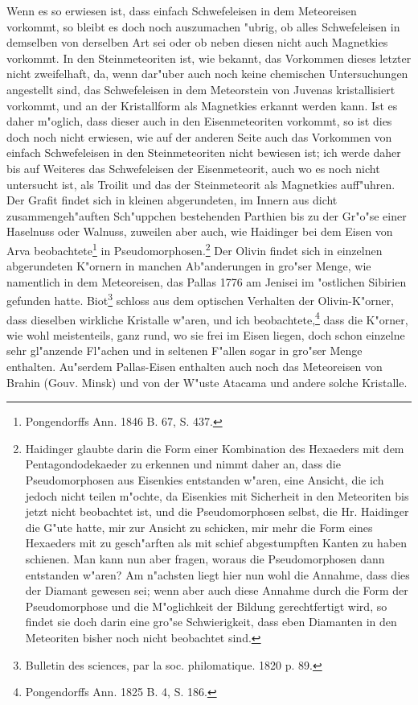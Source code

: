 \documentclass[a4paper, 11pt, oneside]{article}
\begin{document}
Wenn es so erwiesen ist, dass einfach Schwefeleisen in dem Meteoreisen vorkommt, so bleibt es doch noch auszumachen "ubrig, ob alles Schwefeleisen in demselben von derselben Art sei oder ob neben diesen nicht auch Magnetkies vorkommt. In den Steinmeteoriten ist, wie bekannt, das Vorkommen dieses letzter nicht zweifelhaft, da, wenn dar"uber auch noch keine chemischen Untersuchungen angestellt sind, das Schwefeleisen in dem Meteorstein von Juvenas kristallisiert vorkommt, und an der Kristallform als Magnetkies erkannt werden kann. Ist es daher m"oglich, dass dieser auch in den Eisenmeteoriten vorkommt, so ist dies doch noch nicht erwiesen, wie auf der anderen Seite auch das Vorkommen von einfach Schwefeleisen in den Steinmeteoriten nicht bewiesen ist; ich werde daher bis auf Weiteres das Schwefeleisen der Eisenmeteorit, auch wo es noch nicht untersucht ist, als Troilit und das der Steinmeteorit als Magnetkies auff"uhren. Der Grafit findet sich in kleinen abgerundeten, im Innern aus dicht zusammengeh"auften Sch"uppchen bestehenden Parthien bis zu der Gr"o"se einer Haselnuss oder Walnuss, zuweilen aber auch, wie Haidinger bei dem Eisen von Arva beobachtete\footnote{Pongendorffs Ann. 1846 B. 67, S. 437.} in Pseudomorphosen.\footnote{Haidinger glaubte darin die Form einer Kombination des Hexaeders mit dem Pentagondodekaeder zu erkennen und nimmt daher an, dass die Pseudomorphosen aus Eisenkies entstanden w"aren, eine Ansicht, die ich jedoch nicht teilen m"ochte, da Eisenkies mit Sicherheit in den Meteoriten bis jetzt nicht beobachtet ist, und die Pseudomorphosen selbst, die Hr. Haidinger die G"ute hatte, mir zur Ansicht zu schicken, mir mehr die Form eines Hexaeders mit zu gesch"arften als mit schief abgestumpften Kanten zu haben schienen. Man kann nun aber fragen, woraus die Pseudomorphosen dann entstanden w"aren? Am n"achsten liegt hier nun wohl die Annahme, dass dies der Diamant gewesen sei; wenn aber auch diese Annahme durch die Form der Pseudomorphose und die M"oglichkeit der Bildung gerechtfertigt wird, so findet sie doch darin eine gro"se Schwierigkeit, dass eben Diamanten in den Meteoriten bisher noch nicht beobachtet sind.} Der Olivin findet sich in einzelnen abgerundeten K"ornern in manchen Ab"anderungen in gro"ser Menge, wie namentlich in dem Meteoreisen, das Pallas 1776 am Jenisei im "ostlichen Sibirien gefunden hatte. Biot\footnote{Bulletin des sciences, par la soc. philomatique. 1820 p. 89.} schloss aus dem optischen Verhalten der Olivin-K"orner, dass dieselben wirkliche Kristalle w"aren, und ich beobachtete,\footnote{Pongendorffs Ann. 1825 B. 4, S. 186.} dass die K"orner, wie wohl meistenteils, ganz rund, wo sie frei im Eisen liegen, doch schon einzelne sehr gl"anzende Fl"achen und in seltenen F"allen sogar in gro"ser Menge enthalten. Au"serdem Pallas-Eisen enthalten auch noch das Meteoreisen von Brahin (Gouv. Minsk) und von der W"uste Atacama und andere solche Kristalle.
\end{document}
